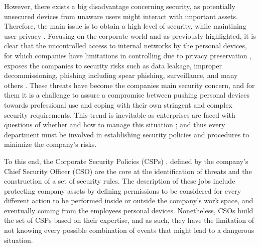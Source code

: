 \documentclass[a4paper,10pt,twocolumn,preprint,3p]{elsarticle}
\begin{document}
However, there exists a big disadvantage concerning security, as
potentially unsecured devices from unaware users might interact with
important assets. Therefore, the main issue is to obtain a high level
of security, while maintining user privacy \cite{miller2012byod}.%
Focusing on the corporate world and as previously highlighted, %
it is clear that the uncontrolled access to internal networks by the
personal devices, for which companies have limitations in
controlling due to privacy preservation \cite{miller2012byod}, exposes the companies to security risks such as data
leakage, improper decommissioning, phishing including spear phishing, surveillance, and many
others \cite{lennon2012changing}. These threats have become the
companies main security concern, and for them it is a challenge to
assure a compromise between pushing personal devices towards
professional use and coping with their own stringent and complex
security requirements. This trend is inevitable as enterprises are
faced with questions of whether and how to manage this situation \cite{thomson2012byod}; and
thus every department must be involved in establishing security
policies and procedures to minimize the company's risks.

To this end, the Corporate Security Policies (CSPs) \cite{Kaeo:2003:DNS:1201807}, %
defined by the company's Chief Security Officer (CSO) are the core at the
identification of threats and the construction of a set of security rules. The description of these jobs include protecting
company assets by defining permissions to be considered for every
different action to be performed inside or outside the company's work
space, and eventually coming from the employees personal
devices. Nonetheless, CSOs build the set of CSPs based on their
expertise, and as such, they have the limitation of not knowing every
possible combination of events that might lead to a dangerous
situation. 
\end{document}
